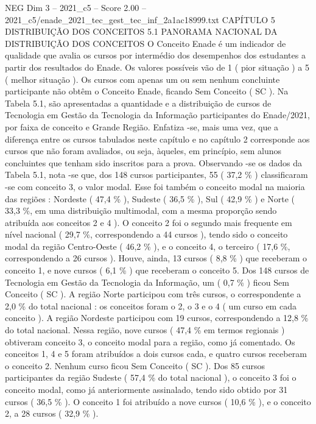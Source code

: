 \begin{textsample}{NEG Dim 3 – 2021\_c5 – Score 2.00 – 2021\_c5/enade\_2021\_tec\_gest\_tec\_inf\_2a1ac18999.txt}  \label{ex:f3_neg_203}
CAPÍTULO 5 DISTRIBUIÇÃO DOS CONCEITOS 5.1 PANORAMA NACIONAL DA DISTRIBUIÇÃO DOS CONCEITOS O Conceito Enade é um indicador de qualidade que avalia os cursos por intermédio dos desempenhos dos estudantes a partir dos resultados do Enade.
Os valores possíveis vão de 1 ( pior situação ) a 5 ( melhor situação ).
Os cursos com apenas um ou sem nenhum concluinte participante não obtêm o Conceito Enade, ficando Sem Conceito ( SC ).
Na Tabela 5.1, são apresentadas a quantidade e a distribuição de cursos de Tecnologia em Gestão da Tecnologia da Informação participantes do Enade/2021, por faixa de conceito e Grande Região.
Enfatiza -se, mais uma vez, que a diferença entre os cursos tabulados neste capítulo e no capítulo 2 corresponde aos cursos que não foram avaliados, ou seja, àqueles, em princípio, sem alunos concluintes que tenham sido inscritos para a prova.
Observando -se os dados da Tabela 5.1, nota -se que, dos 148 cursos participantes, 55 ( 37,2 \% ) classificaram -se com conceito 3, o valor modal.
Esse foi também o conceito modal na maioria das regiões : Nordeste ( 47,4 \% ), Sudeste ( 36,5 \% ), Sul ( 42,9 \% ) e Norte ( 33,3 \%, em uma distribuição multimodal, com a mesma proporção sendo atribuída aos conceitos 2 e 4 ).
O conceito 2 foi o segundo mais frequente em nível nacional ( 29,7 \%, correspondendo a 44 cursos ), tendo sido o conceito modal da região Centro-Oeste ( 46,2 \% ), e o conceito 4, o terceiro ( 17,6 \%, correspondendo a 26 cursos ).
Houve, ainda, 13 cursos ( 8,8 \% ) que receberam o conceito 1, e nove cursos ( 6,1 \% ) que receberam o conceito 5.
Dos 148 cursos de Tecnologia em Gestão da Tecnologia da Informação, um ( 0,7 \% ) ficou Sem Conceito ( SC ).
A região Norte participou com três cursos, o correspondente a 2,0 \% do total nacional : os conceitos foram o 2, o 3 e o 4 ( um curso em cada conceito ).
A região Nordeste participou com 19 cursos, correspondendo a 12,8 \% do total nacional.
Nessa região, nove cursos ( 47,4 \% em termos regionais ) obtiveram conceito 3, o conceito modal para a região, como já comentado.
Os conceitos 1, 4 e 5 foram atribuídos a dois cursos cada, e quatro cursos receberam o conceito 2.
Nenhum curso ficou Sem Conceito ( SC ).
Dos 85 cursos participantes da região Sudeste ( 57,4 \% do total nacional ), o conceito 3 foi o conceito modal, como já anteriormente assinalado, tendo sido obtido por 31 cursos ( 36,5 \% ).
O conceito 1 foi atribuído a nove cursos ( 10,6 \% ), e o conceito 2, a 28 cursos ( 32,9 \% ).

\end{textsample}

